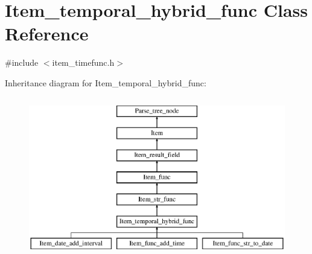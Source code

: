 \hypertarget{classItem__temporal__hybrid__func}{}\section{Item\+\_\+temporal\+\_\+hybrid\+\_\+func Class Reference}
\label{classItem__temporal__hybrid__func}


{\ttfamily \#include $<$item\+\_\+timefunc.\+h$>$}

Inheritance diagram for Item\+\_\+temporal\+\_\+hybrid\+\_\+func\+:\begin{figure}[H]
\begin{center}
\leavevmode
\includegraphics[height=7.000000cm]{classItem__temporal__hybrid__func}
\end{center}
\end{figure}
